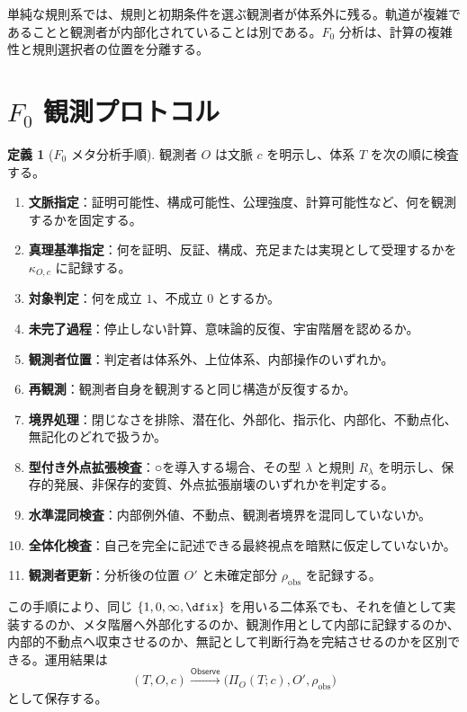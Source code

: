 \documentclass[a4paper,11pt]{ltjsarticle}
\theoremstyle{definition}
\newtheorem{definition}{定義}[section]
\theoremstyle{plain}
\newcommand{\Phase}{\Pi}
\newcommand{\Observe}{\mathsf{Observe}}
\newcommand{\Residual}{\rho_{\mathrm{obs}}}
\newcommand{\TruthCriterion}{\kappa}
\begin{document}
単純な規則系では、規則と初期条件を選ぶ観測者が体系外に残る。軌道が複雑であることと観測者が内部化されていることは別である。$F_0$ 分析は、計算の複雑性と規則選択者の位置を分離する。

\section{\texorpdfstring{$F_0$}{F0} 観測プロトコル}

\begin{definition}[$F_0$ メタ分析手順]
観測者 $O$ は文脈 $c$ を明示し、体系 $T$ を次の順に検査する。
\begin{enumerate}
 \item \textbf{文脈指定}：証明可能性、構成可能性、公理強度、計算可能性など、何を観測するかを固定する。
 \item \textbf{真理基準指定}：何を証明、反証、構成、充足または実現として受理するかを $\TruthCriterion_{O,c}$ に記録する。
 \item \textbf{対象判定}：何を成立 $1$、不成立 $0$ とするか。
 \item \textbf{未完了過程}：停止しない計算、意味論的反復、宇宙階層を認めるか。
 \item \textbf{観測者位置}：判定者は体系外、上位体系、内部操作のいずれか。
 \item \textbf{再観測}：観測者自身を観測すると同じ構造が反復するか。
 \item \textbf{境界処理}：閉じなさを排除、潜在化、外部化、指示化、内部化、不動点化、無記化のどれで扱うか。
 \item \textbf{型付き外点拡張検査}：○を導入する場合、その型 $\lambda$ と規則 $R_\lambda$ を明示し、保存的発展、非保存的変質、外点拡張崩壊のいずれかを判定する。
 \item \textbf{水準混同検査}：内部例外値、不動点、観測者境界を混同していないか。
 \item \textbf{全体化検査}：自己を完全に記述できる最終視点を暗黙に仮定していないか。
 \item \textbf{観測者更新}：分析後の位置 $O'$ と未確定部分 $\Residual$ を記録する。
\end{enumerate}
\end{definition}

この手順により、同じ $\{1,0,\infty,\dfix\}$ を用いる二体系でも、それを値として実装するのか、メタ階層へ外部化するのか、観測作用として内部に記録するのか、内部的不動点へ収束させるのか、無記として判断行為を完結させるのかを区別できる。運用結果は
\[
 (T,O,c)
 \xrightarrow{\Observe}
 \bigl(\Phase_O(T;c),O',\Residual\bigr)
\]
として保存する。
\end{document}

